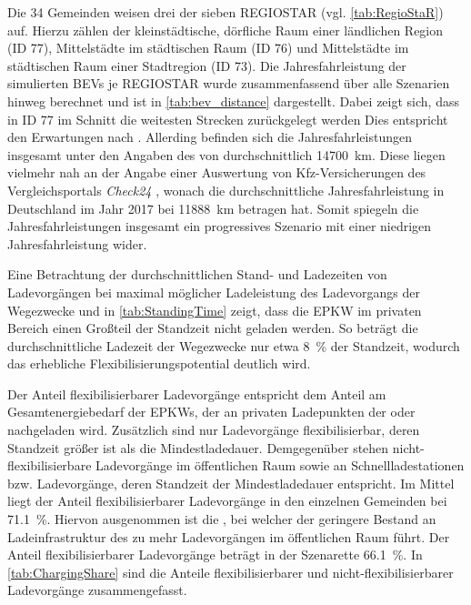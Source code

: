 Die \num{34} Gemeinden weisen drei der sieben \gls{REGIOSTAR} (vgl. \autoref{tab:RegioStaR}) auf.
Hierzu zählen der kleinstädtische, dörfliche Raum einer ländlichen Region (\gls{ID} \num{77}), Mittelstädte im städtischen Raum (\gls{ID} \num{76}) und Mittelstädte im städtischen Raum einer Stadtregion (\gls{ID} \num{73}).
Die Jahresfahrleistung der simulierten \glspl{BEV} je \gls{REGIOSTAR} wurde zusammenfassend über alle Szenarien hinweg berechnet und ist in \autoref{tab:bev_distance} dargestellt.
Dabei zeigt sich, dass in \gls{ID} \num{77} im Schnitt die weitesten Strecken zurückgelegt werden
Dies entspricht den Erwartungen nach  \cite{Nobis2019}.
Allerding befinden sich die Jahresfahrleistungen insgesamt unter den Angaben des  von durchschnittlich \SI{14700}{\km}.
Diese liegen vielmehr nah an der Angabe einer Auswertung von Kfz-Versicherungen des Vergleichsportals \textit{Check24} \cite{CHECK24GmbH2018}, wonach die durchschnittliche Jahresfahrleistung in Deutschland im Jahr \num{2017} bei \SI{11888}{\km} betragen hat.
Somit spiegeln die Jahresfahrleistungen  insgesamt ein progressives Szenario mit einer niedrigen Jahresfahrleistung wider.



Eine Betrachtung der durchschnittlichen Stand- und Ladezeiten von Ladevorgängen bei maximal möglicher Ladeleistung des Ladevorgangs der Wegezwecke \Arbeit und \nH in \autoref{tab:StandingTime} zeigt, dass die \gls{EPKW} im privaten Bereich einen Großteil der Standzeit nicht geladen werden.
So beträgt die durchschnittliche Ladezeit der Wegezwecke nur etwa \SI{8}{\percent} der Standzeit, wodurch das erhebliche Flexibilisierungspotential deutlich wird.



Der Anteil flexibilisierbarer Ladevorgänge entspricht dem Anteil am Gesamtenergiebedarf der \glspl{EPKW}, der an privaten Ladepunkten der \UCs \zH oder \Firmeparkplatz nachgeladen wird.
Zusätzlich sind nur Ladevorgänge flexibilisierbar, deren Standzeit größer ist als die Mindestladedauer.
Demgegenüber stehen nicht-flexibilisierbare Ladevorgänge im öffentlichen Raum sowie an Schnellladestationen bzw. Ladevorgänge, deren Standzeit der Mindestladedauer entspricht.
Im Mittel liegt der Anteil flexibilisierbarer Ladevorgänge in den einzelnen Gemeinden bei \SI{71.1}{\percent}.
Hiervon ausgenommen ist die \SzeFirmenparkplatzdot, bei welcher der geringere Bestand an Ladeinfrastruktur des \UC \Firmeparkplatz zu mehr Ladevorgängen im öffentlichen Raum führt.
Der Anteil flexibilisierbarer Ladevorgänge beträgt in der Szenarette \SI{66.1}{\percent}.
In \autoref{tab:ChargingShare} sind die Anteile flexibilisierbarer und nicht-flexibilisierbarer Ladevorgänge zusammengefasst.

